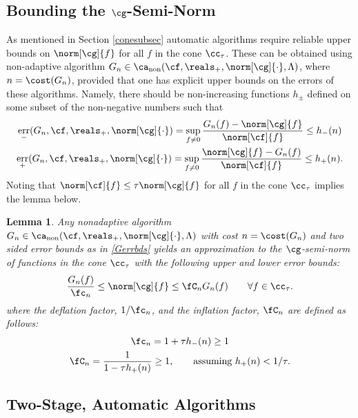 \documentclass[]{elsarticle}
\DeclareMathOperator{\fix}{non}
\DeclareMathOperator{\err}{err}
\newtheorem{lem}{Lemma}
\theoremstyle{definition}
\theoremstyle{remark}
\begin{document}
\subsection{Bounding the $\cg$-Semi-Norm}

As mentioned in Section \ref{conesubsec} automatic algorithms require reliable upper bounds on $\norm[\cg]{f}$ for all $f$ in the cone $\cc_{\tau}$. These can be obtained using non-adaptive algorithm $G_n \in \ca_{\fix}(\cf,\reals_+,\norm[\cg]{\cdot},\Lambda)$, where $n=\cost(G_n)$, provided that one has explicit upper bounds on the errors of these algorithms.  Namely, there should be non-increasing functions $h_{\pm}$ defined on some subset of the non-negative numbers such that
\begin{subequations}\label{Gerrbds}
\begin{gather}
\err_{-}(G_n,\cf,\reals_{+},\norm[\cg]{\cdot}) = \sup_{f \ne 0} \frac{G_n(f)-\norm[\cg]{f}}{\norm[\cf]{f}} \le h_{ -}(n) \\
\err_{+}(G_n,\cf,\reals_{+},\norm[\cg]{\cdot}) = \sup_{f \ne 0} \frac{\norm[\cg]{f}-G_n(f)}{\norm[\cf]{f}} \le h_{ +}(n).
\end{gather}
\end{subequations}
Noting that $\norm[\cf]{f} \le \tau \norm[\cg]{f}$ for all $f$ in the cone $\cc_{\tau}$ implies the lemma below. 

\begin{lem} \label{Gnormlem} Any nonadaptive algorithm $G_n \in \ca_{\fix}(\cf,\reals_+,\norm[\cg]{\cdot},\Lambda)$ with cost $n=\cost(G_n)$ and two sided error bounds as in \eqref{Gerrbds} yields an approximation to the $\cg$-semi-norm of functions in the cone $\cc_{\tau}$ with the following upper and lower error bounds:
\begin{equation} \label{twosidedGineq}
\frac{G_n(f)}{\fc_n} \le \norm[\cg]{f} \le \fC_n G_n(f) \qquad \forall f \in \cc_{\tau}.
\end{equation}
where the deflation factor, $1/\fc_n$, and the inflation factor, $\fC_n$ are defined as follows:
\begin{gather} \label{normdeflate}
\fc_n =1 + \tau h_{ -}(n)  \ge 1 \\
\label{norminflate}
\fC_n =\frac{1}{1 - \tau h_{ +}(n)} \ge 1, \qquad \text{assuming } h_{ +}(n) < 1/\tau.
\end{gather}
\end{lem}

\subsection{Two-Stage, Automatic Algorithms}
\end{document}
